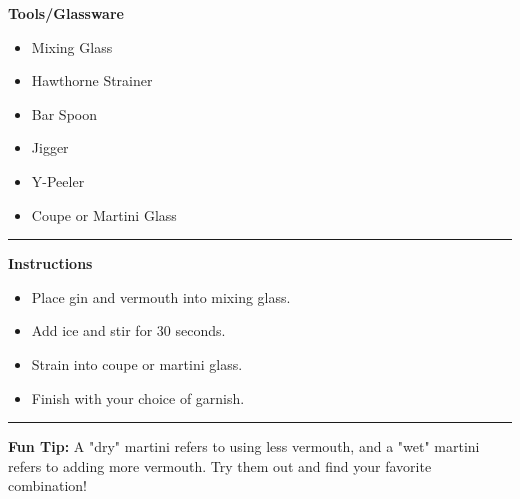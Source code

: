 \hspace{.01\textwidth}\vrule\hspace{.01\textwidth}
\begin{minipage}[t]{.49\textwidth}
    \noindent
    \textbf{\large Tools/Glassware}
    \begin{itemize}
        \item Mixing Glass
        \item Hawthorne Strainer
        \item Bar Spoon
        \item Jigger
        \item Y-Peeler
        \item Coupe or Martini Glass
    \end{itemize}
\end{minipage}
\vspace{.5em}\hrule\vspace{.5em}
\noindent
\begin{minipage}{\textwidth}
    \noindent
    \textbf{\large Instructions}
    \begin{itemize}
        \item Place gin and vermouth into mixing glass.
        \item Add ice and stir for 30 seconds.
        \item Strain into coupe or martini glass.
        \item Finish with your choice of garnish.
    \end{itemize}
\end{minipage}
\vspace{.5em}\hrule\vspace{.5em}
\noindent
\textbf{\large Fun Tip:} A "dry" martini refers to using less vermouth, and a "wet" martini refers to adding more vermouth. Try them out and find your favorite combination!
\newpage
